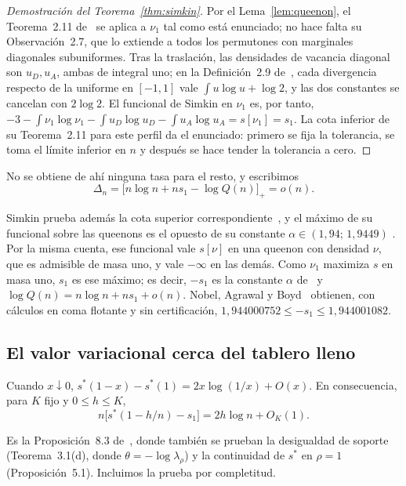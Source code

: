 \begin{proof}[Demostración del Teorema~\ref{thm:simkin}]
Por el Lema~\ref{lem:queenon}, el Teorema~2.11 de~\cite{Simkin} se aplica a $\nu_1$ tal como
está enunciado; no hace falta su Observación~2.7, que lo extiende a todos los permutones con
marginales diagonales subuniformes. Tras la traslación, las densidades de vacancia diagonal son $u_D,u_A$,
ambas de integral
uno; en la Definición~2.9 de~\cite{Simkin}, cada divergencia respecto de la uniforme en $[-1,1]$
vale $\int u\log u+\log2$, y las dos constantes se cancelan con $2\log2$. El funcional de
Simkin en $\nu_1$ es, por tanto,
$-3-\int\nu_1\log\nu_1-\int u_D\log u_D-\int u_A\log u_A=s[\nu_1]=s_1$. La cota inferior de
su Teorema~2.11 para este perfil da el enunciado: primero se fija la tolerancia, se toma el
límite inferior en $n$ y después se hace tender la tolerancia a cero.
\end{proof}

No se obtiene de ahí ninguna tasa para el resto, y escribimos
\begin{equation}\label{eq:Delta}
 \Delta_n=\bigl[n\log n+ns_1-\log Q(n)\bigr]_+=o(n).
\end{equation}

Simkin prueba además la cota superior correspondiente~\cite[Teorema~1.1]{Simkin}, y el máximo de su
funcional sobre las queenons es el opuesto de su constante $\alpha\in(1{,}94;\,1{,}9449)$
\cite[Sección~2]{Simkin}. Por la misma cuenta, ese funcional vale $s[\nu]$ en una queenon con
densidad $\nu$, que es admisible de masa uno, y vale $-\infty$ en las demás. Como $\nu_1$ maximiza
$s$ en masa uno, $s_1$ es ese máximo; es decir, $-s_1$ es la constante $\alpha$ de~\cite{Simkin} y
$\log Q(n)=n\log n+ns_1+o(n)$. Nobel, Agrawal y Boyd~\cite{NAB} obtienen, con cálculos en coma
flotante y sin certificación, $1{,}944000752\le-s_1\le1{,}944001082$.

\subsection{El valor variacional cerca del tablero lleno}

\begin{lema}\label{lem:borde}
Cuando $x\downarrow0$, $s^*(1-x)-s^*(1)=2x\log(1/x)+O(x)$. En consecuencia, para $K$ fijo y
$0\le h\le K$,
\[
 n\bigl[s^*(1-h/n)-s_1\bigr]=2h\log n+O_K(1).
\]
\end{lema}

Es la Proposición~8.3 de~\cite{Perfil}, donde también se prueban la desigualdad de soporte
(Teorema~3.1(d), donde $\theta=-\log\lambda_\rho$) y la continuidad de $s^*$ en $\rho=1$ (Proposición~5.1).
Incluimos la prueba
por completitud.

